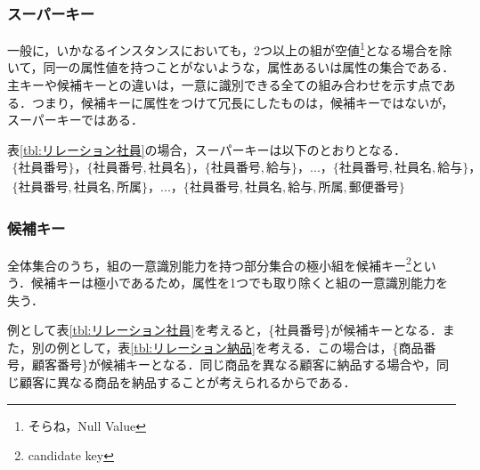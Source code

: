 \documentclass[a4paper,10pt]{jreport}
\begin{document}
\subsubsection{スーパーキー}
一般に，いかなるインスタンスにおいても，2つ以上の組が空値\footnote{そらね，Null Value}となる場合を除いて，同一の属性値を持つことがないような，属性あるいは属性の集合である．主キーや候補キーとの違いは，一意に識別できる全ての組み合わせを示す点である．つまり，候補キーに属性をつけて冗長にしたものは，候補キーではないが，スーパーキーではある．
\par 表\ref{tbl:リレーション社員}の場合，スーパーキーは以下のとおりとなる．
\begin{eqnarray}
	\{社員番号\}，\{社員番号,社員名\}，\{社員番号,給与\}，...，\{社員番号,社員名,給与\}， \\
	\{社員番号,社員名,所属\}，...，\{社員番号,社員名,給与,所属,郵便番号\}
\end{eqnarray}



\subsubsection{候補キー}
全体集合のうち，組の一意識別能力を持つ部分集合の極小組を候補キー\footnote{candidate key}という．候補キーは極小であるため，属性を1つでも取り除くと組の一意識別能力を失う．
\par 例として表\ref{tbl:リレーション社員}を考えると，\{社員番号\}が候補キーとなる．また，別の例として，表\ref{tbl:リレーション納品}を考える．この場合は，\{商品番号，顧客番号\}が候補キーとなる．同じ商品を異なる顧客に納品する場合や，同じ顧客に異なる商品を納品することが考えられるからである．




\end{document}
